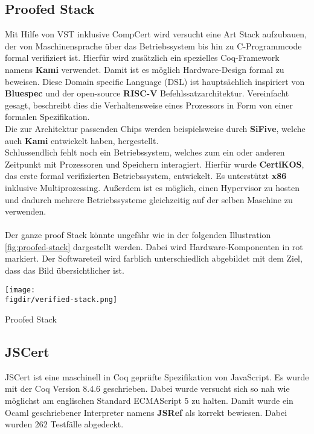 \subsection{Proofed Stack}
Mit Hilfe von VST inklusive CompCert wird versucht eine Art Stack aufzubauen, der von Maschinensprache über das Betriebssystem bis hin zu C-Programmcode formal verifiziert ist. Hierfür wird zusätzlich ein spezielles Coq-Framework namens \textbf{Kami} verwendet. Damit ist es möglich Hardware-Design formal zu beweisen. Diese Domain specific Language (DSL) ist hauptsächlich inspiriert von \textbf{Bluespec} und der open-source \textbf{RISC-V} Befehlssatzarchitektur.\cite{KAMI01:ST} Vereinfacht gesagt, beschreibt dies die Verhaltensweise eines Prozessors in Form von einer formalen Spezifikation.\\
Die zur Architektur passenden Chips werden beispielsweise durch \textbf{SiFive}, welche auch \textbf{Kami} entwickelt haben, hergestellt.\\
Schlussendlich fehlt noch ein Betriebssystem, welches zum ein oder anderen Zeitpunkt mit Prozessoren und Speichern interagiert. Hierfür wurde \textbf{CertiKOS}, das erste formal verifizierten Betriebssystem, entwickelt. Es unterstützt \textbf{x86} inklusive Multiprozessing. Außerdem ist es möglich, einen Hypervisor zu hosten und dadurch mehrere Betriebssysteme gleichzeitig auf der selben Maschine zu verwenden.\cite{CERTIKOS01:FV}\cite{CERTIKOS02:FV}\\
\\
Der ganze proof Stack könnte ungefähr wie in der folgenden Illustration \ref{fig:proofed-stack} dargestellt werden. Dabei wird Hardware-Komponenten in rot markiert. Der Softwareteil wird farblich unterschiedlich abgebildet mit dem Ziel, dass das Bild übersichtlicher ist.\\


\begin{minipage}{\textwidth}
	\centering
	\captionsetup{type=figure}
	\texttt{[image: \\figdir/verified-stack.png]}
	\caption{Proofed Stack}
	\label{fig:proofed-stack}
\end{minipage}


\subsection{JSCert}
JSCert ist eine maschinell in Coq geprüfte Spezifikation von JavaScript. Es wurde mit der Coq Version 8.4.6 geschrieben. Dabei wurde versucht sich so nah wie möglichst am englischen Standard ECMAScript 5 zu halten. Damit wurde ein Ocaml geschriebener Interpreter namens \textbf{JSRef} als korrekt bewiesen. Dabei wurden 262 Testfälle abgedeckt.\cite{JSCERT01:FV}\cite{JSCERT012:FV}


